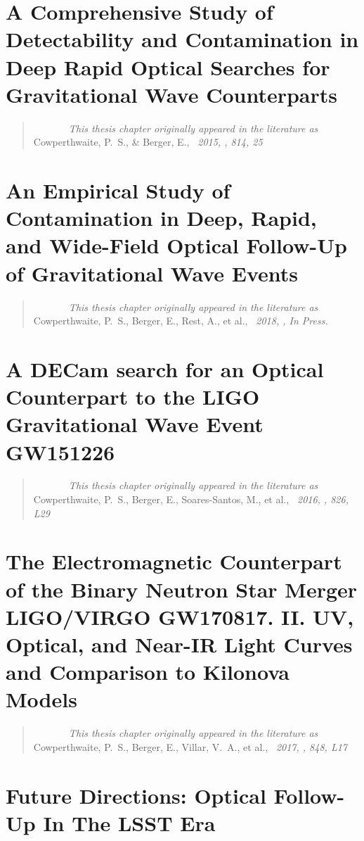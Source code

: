 \documentclass[bound]{hvdthesis}
\begin{document}
\chapter{A Comprehensive Study of Detectability and Contamination in Deep Rapid Optical Searches for Gravitational Wave Counterparts}\label{c:occ}
\begin{quote}
{\em ~~~~~~~This thesis chapter originally appeared in the literature as} \\
{Cowperthwaite, P.~S., \& Berger, E.,
{\em \ 2015, \apj, 814, 25}}
\end{quote}

\clearpage
%
\chapter{An Empirical Study of Contamination in Deep, Rapid, and Wide-Field Optical Follow-Up of Gravitational Wave Events}\label{c:occ2}
\begin{quote}
{\em ~~~~~~~This thesis chapter originally appeared in the literature as} \\
{Cowperthwaite, P.~S., Berger, E., Rest, A., et al.,
{\em \ 2018, \apj, In Press.}}
\end{quote}

\clearpage
%
\chapter{A DECam search for an Optical Counterpart to the LIGO Gravitational Wave Event GW151226}\label{c:occ3}
\begin{quote}
{\em ~~~~~~~This thesis chapter originally appeared in the literature as} \\
{Cowperthwaite, P.~S., Berger, E., Soares-Santos, M., et al.,
{\em\ 2016, \apjl, 826, L29}}
\end{quote}

\clearpage
%
\chapter{The Electromagnetic Counterpart of the Binary Neutron Star Merger LIGO/VIRGO GW170817. II. UV, Optical, and Near-IR Light Curves and Comparison to Kilonova Models}\label{c:occ4}
\begin{quote}
{\em ~~~~~~~This thesis chapter originally appeared in the literature as} \\
{Cowperthwaite, P.~S., Berger, E., Villar, V.~A., et al.,
{\em \ 2017, \apjl, 848, L17}}
\end{quote}

\clearpage
%
\chapter{Future Directions: Optical Follow-Up In The LSST Era}\label{c:occ5}


\singlespace


\end{document}
